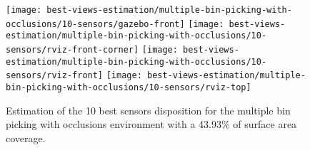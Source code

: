 \begin{figure}
	\centering
	\texttt{[image: best-views-estimation/multiple-bin-picking-with-occlusions/10-sensors/gazebo-front]}\vspace{2em}
	\texttt{[image: best-views-estimation/multiple-bin-picking-with-occlusions/10-sensors/rviz-front-corner]}\vspace{2em}
	\texttt{[image: best-views-estimation/multiple-bin-picking-with-occlusions/10-sensors/rviz-front]}\vspace{2em}
	\texttt{[image: best-views-estimation/multiple-bin-picking-with-occlusions/10-sensors/rviz-top]}
	\caption{Estimation of the 10 best sensors disposition for the multiple bin picking with occlusions environment with a 43.93\% of surface area coverage.}
\end{figure}
